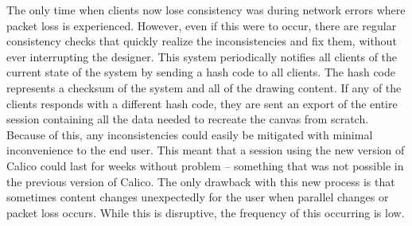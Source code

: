 The only time when clients now lose consistency was during network errors where packet loss is experienced. However, even if this were to occur, there are regular consistency checks that quickly realize the inconsistencies and fix them, without ever interrupting the designer. This system periodically notifies all clients of the current state of the system by sending a hash code to all clients. The hash code represents a checksum of the system and all of the drawing content. If any of the clients responds with a different hash code, they are sent an export of the entire session containing all the data needed to recreate the canvas from scratch. Because of this, any inconsistencies could easily be mitigated with minimal inconvenience to the end user. This meant that a session using the new version of Calico could last for weeks without problem -- something that was not possible in the previous version of Calico. The only drawback with this new process is that sometimes content changes unexpectedly for the user when parallel changes or packet loss occurs. While this is disruptive, the frequency of this occurring is low.
